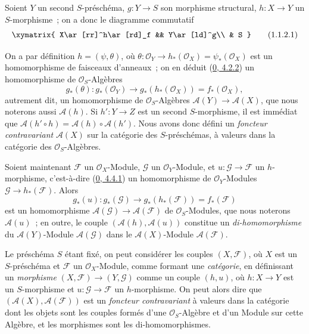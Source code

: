 \begin{env}[1.1.2]
\label{II.1.1.2-fr}
Soient $Y$ un second $S$-préschéma, $g:Y\to S$ son morphisme structural,
$h:X\to Y$ un $S$-morphisme~; on a donc le diagramme commutatif
\[
  \xymatrix{
    X\ar[rr]^h\ar[rd]_f && Y\ar[ld]^g\\
    & S
  }
  \tag{1.1.2.1}\label{II.1.1.2.1-fr}
\]

On a par définition $h=(\psi,\theta)$, où
$\theta:\mathcal{O}_Y\to h_*(\mathcal{O}_X)=\psi_*(\mathcal{O}_X)$ est un
homomorphisme de faisceaux d'anneaux~; on en déduit
(\hyperref[0.4.2.2-fr]{0, 4.2.2}) un homomorphisme de
$\mathcal{O}_S$-Algèbres
\[
  g_*(\theta):g_*(\mathcal{O}_Y)\to
  g_*(h_*(\mathcal{O}_X))=f_*(\mathcal{O}_X),
\]
autrement dit, un homomorphisme de $\mathcal{O}_S$-Algèbres
$\mathcal{A}(Y)\to\mathcal{A}(X)$, que nous noterons aussi
$\mathcal{A}(h)$. Si $h':Y\to Z$ est un second $S$-morphisme, il est immédiat
que $\mathcal{A}(h'\circ h)=\mathcal{A}(h)\circ\mathcal{A}(h')$. Nous avons
donc défini un \emph{foncteur contravariant} $\mathcal{A}(X)$ sur la catégorie
des $S$-préschémas, à valeurs dans la catégorie des
$\mathcal{O}_S$-Algèbres.

Soient maintenant $\mathcal{F}$ un $\mathcal{O}_X$-Module, $\mathcal{G}$ un
$\mathcal{O}_Y$-Module, et $u:\mathcal{G}\to\mathcal{F}$ un $h$-morphisme,
c'est-à-dire (\hyperref[0.4.4.1-fr]{0, 4.4.1}) un homomorphisme de
$\mathcal{O}_Y$-Modules $\mathcal{G}\to h_*(\mathcal{F})$. Alors
\[
  g_*(u):g_*(\mathcal{G})\to g_*(h_*(\mathcal{F}))=f_*(\mathcal{F})
\]
est un homomorphisme $\mathcal{A}(\mathcal{G})\to
\mathcal{A}(\mathcal{F})$ de $\mathcal{O}_S$-Modules, que nous noterons
$\mathcal{A}(u)$~; en outre, le couple
$(\mathcal{A}(h),\mathcal{A}(u))$ constitue un \emph{di-homomorphisme} du
$\mathcal{A}(Y)$-Module $\mathcal{A}(\mathcal{G})$ dans le
$\mathcal{A}(X)$-Module $\mathcal{A}(\mathcal{F})$.
\end{env}

\begin{env}[1.1.3]
\label{II.1.1.3-fr}
Le préschéma $S$ étant fixé, on peut considérer les couples
$(X,\mathcal{F})$, où $X$ est un $S$-préschéma et $\mathcal{F}$ un
$\mathcal{O}_X$-Module, comme formant une \emph{catégorie}, en définissant un
\emph{morphisme} $(X,\mathcal{F})\to(Y,\mathcal{G})$ comme un couple $(h,u)$,
où $h:X\to Y$ est un $S$-morphisme et $u:\mathcal{G}\to\mathcal{F}$ un
$h$-morphisme. On peut alors dire que
$(\mathcal{A}(X),\mathcal{A}(\mathcal{F}))$ est un \emph{foncteur
contravariant} à valeurs dans la catégorie dont les objets sont les couples
formés d'une $\mathcal{O}_S$-Algèbre et d'un Module sur cette Algèbre, et les
morphismes sont les di-homomorphismes.
\end{env}

